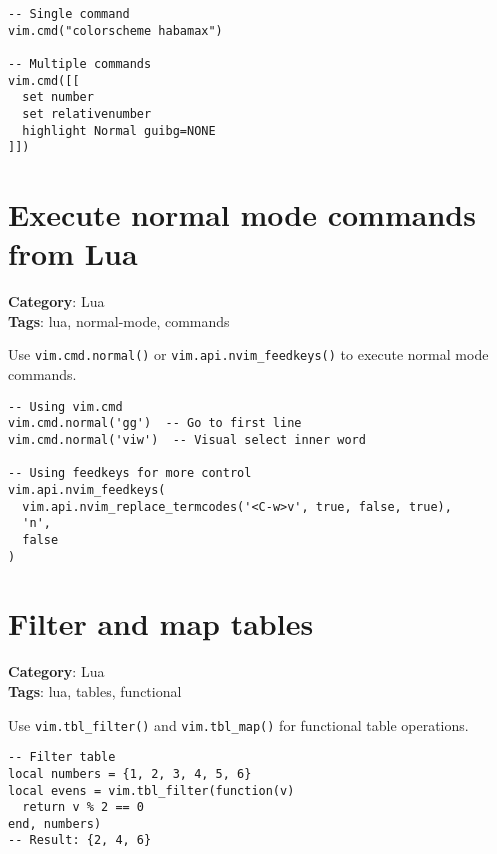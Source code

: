 {{{{{{\begin{Exa*}{}
\begin{Verbatim}[fontsize=\footnotesize, breaklines, breakanywhere]
-- Single command
vim.cmd("colorscheme habamax")

-- Multiple commands
vim.cmd([[
  set number
  set relativenumber
  highlight Normal guibg=NONE
]])
\end{Verbatim}
\end{Exa*}

\section{Execute normal mode commands from Lua}

\textbf{Category}: Lua\\ \textbf{Tags}: lua, normal-mode, commands
\vspace{0.5cm}

Use {\footnotesize \Verb§vim.cmd.normal()§} or {\footnotesize \Verb§vim.api.nvim_feedkeys()§} to execute normal mode commands.

\begin{Exa*}{}
\begin{Verbatim}[fontsize=\footnotesize, breaklines, breakanywhere]
-- Using vim.cmd
vim.cmd.normal('gg')  -- Go to first line
vim.cmd.normal('viw')  -- Visual select inner word

-- Using feedkeys for more control
vim.api.nvim_feedkeys(
  vim.api.nvim_replace_termcodes('<C-w>v', true, false, true),
  'n',
  false
)
\end{Verbatim}
\end{Exa*}

\section{Filter and map tables}

\textbf{Category}: Lua\\ \textbf{Tags}: lua, tables, functional
\vspace{0.5cm}

Use {\footnotesize \Verb§vim.tbl_filter()§} and {\footnotesize \Verb§vim.tbl_map()§} for functional table operations.

\begin{Exa*}{}
\begin{Verbatim}[fontsize=\footnotesize, breaklines, breakanywhere]
-- Filter table
local numbers = {1, 2, 3, 4, 5, 6}
local evens = vim.tbl_filter(function(v)
  return v % 2 == 0
end, numbers)
-- Result: {2, 4, 6}


\end{Verbatim}
\end{Exa*}}}}}}}

